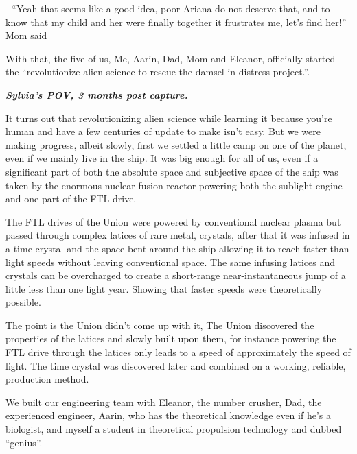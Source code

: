 \documentclass[colorlinks,12pt,a4paper]{book}
\begin{document}
 - “Yeah that seems like a good idea, poor Ariana do not deserve that, and to know that my child and her were finally 
 together it frustrates me, let's find her!” Mom said\par
 \bigskip
 
 With that, the five of us, Me, Aarin, Dad, Mom and Eleanor, officially started the “revolutionize alien science to rescue
  the damsel in distress project.”.\par
  \bigskip
 
 \textit{\textbf{Sylvia's POV, 3 months post capture.}}
 
 It turns out that revolutionizing alien science while learning it because you're human and have a few centuries of update 
 to make isn't easy. But we were making progress, albeit slowly, first we settled a little camp on one of the planet, 
 even if we mainly live in the ship. It was big enough for all of us, even if a significant part of both the absolute 
 space and subjective space of the ship was taken by the enormous nuclear fusion reactor powering both the sublight engine 
 and one part of the FTL drive. \par
 \bigskip
 
 The FTL drives of the Union were powered by conventional nuclear plasma but passed through complex latices of rare metal, 
 crystals, after that it was infused in a time crystal and the space bent around the ship allowing it to reach faster 
 than light speeds without leaving conventional space. The same infusing latices and crystals can be overcharged to create 
 a short-range near-instantaneous jump of a little less than one light year. Showing that faster speeds were theoretically 
 possible.\par
 \bigskip
 
 The point is the Union didn't come up with it, The Union discovered the properties of the latices and slowly built upon them, 
 for instance powering the FTL drive through the latices only leads to a speed of approximately the speed of light. 
 The time crystal was discovered later and combined on a working, reliable, production method.\par
 \bigskip
 
 We built our engineering team with Eleanor, the number crusher, Dad, the experienced engineer, Aarin, who has the 
 theoretical knowledge even if he's a biologist, and myself a student in theoretical propulsion technology and dubbed 
 “genius”. \par
 \bigskip
 
\end{document}
